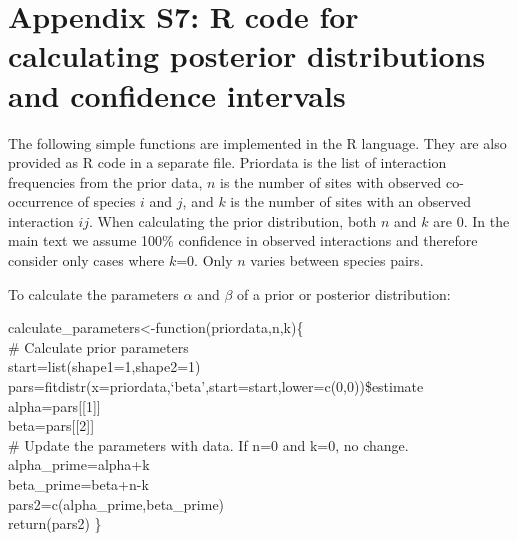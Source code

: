 \documentclass[12pt]{article}
\begin{document}

\clearpage

\section*{Appendix S7: R code for calculating posterior distributions and confidence intervals}

  The following simple functions are implemented in the R language. They are 
  also provided as R code in a separate file.
  Priordata is the list of interaction frequencies from the prior 
  data, $n$ is the number of sites with observed co-occurrence of 
  species $i$ and $j$, and $k$ is the number of sites with an 
  observed interaction $ij$. When calculating the prior 
  distribution, both $n$ and $k$ are 0. In the main text we assume 100\%
  confidence in observed interactions and therefore consider only 
  cases where $k$=0. Only $n$ varies between species pairs.


  To calculate the parameters $\alpha$ and $\beta$ of a prior or 
  posterior distribution:

  \vspace{12pt}
  \begin{em}
  \noindent \hspace{2pt}calculate\_parameters\textless-function(priordata,n,k)\{\\
  \vspace{4pt}
    \# Calculate prior parameters\\
    start=list(shape1=1,shape2=1)\\
    pars=fitdistr(x=priordata,`beta',start=start,lower=c(0,0))\$estimate\\
    alpha=pars[[1]]\\
    beta=pars[[2]]\\
  \vspace{4pt}
    \# Update the parameters with data. If n=0 and k=0, no change.\\
    alpha\_prime=alpha+k\\
    beta\_prime=beta+n-k\\
    pars2=c(alpha\_prime,beta\_prime)\\
    return(pars2) \}
  \end{em}
  \vspace{12pt}
\end{document}
